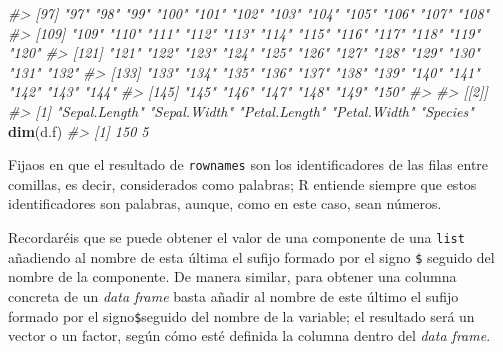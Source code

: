 \documentclass[
]{book}
\newenvironment{Shaded}{\begin{snugshade}}{\end{snugshade}}
\newcommand{\CommentTok}[1]{\textcolor[rgb]{0.56,0.35,0.01}{\textit{#1}}}
\newcommand{\DecValTok}[1]{\textcolor[rgb]{0.00,0.00,0.81}{#1}}
\newcommand{\KeywordTok}[1]{\textcolor[rgb]{0.13,0.29,0.53}{\textbf{#1}}}
\newcommand{\NormalTok}[1]{#1}
\newcommand{\OperatorTok}[1]{\textcolor[rgb]{0.81,0.36,0.00}{\textbf{#1}}}
\theoremstyle{definition}
\theoremstyle{definition}
\theoremstyle{definition}
\theoremstyle{remark}
\begin{document}
\begin{Shaded}
\begin{Highlighting}[]
\CommentTok{\#\textgreater{}  [97] "97"  "98"  "99"  "100" "101" "102" "103" "104" "105" "106" "107" "108"}
\CommentTok{\#\textgreater{} [109] "109" "110" "111" "112" "113" "114" "115" "116" "117" "118" "119" "120"}
\CommentTok{\#\textgreater{} [121] "121" "122" "123" "124" "125" "126" "127" "128" "129" "130" "131" "132"}
\CommentTok{\#\textgreater{} [133] "133" "134" "135" "136" "137" "138" "139" "140" "141" "142" "143" "144"}
\CommentTok{\#\textgreater{} [145] "145" "146" "147" "148" "149" "150"}
\CommentTok{\#\textgreater{} }
\CommentTok{\#\textgreater{} [[2]]}
\CommentTok{\#\textgreater{} [1] "Sepal.Length" "Sepal.Width"  "Petal.Length" "Petal.Width"  "Species"}
\KeywordTok{dim}\NormalTok{(d.f)}
\CommentTok{\#\textgreater{} [1] 150   5}
\end{Highlighting}
\end{Shaded}

Fijaos en que el resultado de \texttt{rownames} son los identificadores de las filas entre comillas, es decir, considerados como palabras; R entiende siempre que estos identificadores son palabras, aunque, como en este caso, sean números.

Recordaréis que se puede obtener el valor de una componente de una \texttt{list} añadiendo al nombre de esta última el sufijo formado por el signo \texttt{\$} seguido del nombre de la componente. De manera similar, para obtener una columna concreta de un \emph{data frame} basta añadir al nombre de este último el sufijo formado por el signo\texttt{\$}seguido del nombre de la variable; el resultado será un vector o un factor, según cómo esté definida la columna dentro del \emph{data frame}.

\begin{Shaded}
\end{Shaded}
\end{document}
